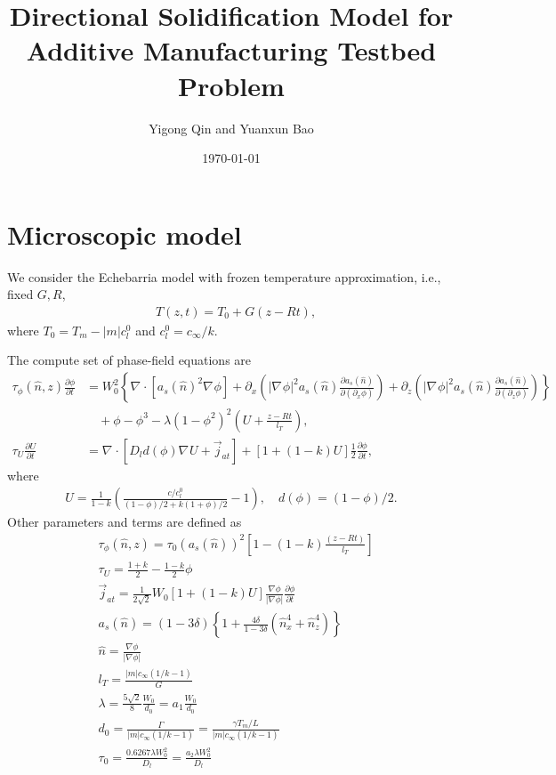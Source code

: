 \documentclass[a4paper,12pt]{article}
\title{Directional Solidification Model for Additive Manufacturing Testbed Problem}
\author{Yigong Qin and Yuanxun Bao}
\date{\today}
\renewcommand{\div}[1]{\nabla_{#1} \cdot}
\newcommand{\grad}[1]{\nabla_{#1}}
\begin{document}
\maketitle




\section{Microscopic model}
We consider the Echebarria model \cite{Tourret2015,Echebarria2010,Plapp2007,Echebarria2004} with frozen temperature approximation, i.e., fixed $G,R$,
\begin{align}
    & T(z,t) = T_0 + G(z-Rt),
\end{align}
where $T_0 = T_m - |m|c_l^0$ and $c_l^0 = c_{\infty}/ k$. 

The compute set of phase-field equations are 
\begin{align}
\tau_{\phi} (\hat{n},z) \frac{\partial \phi}{\partial t} &= W^2_0 \left\{ \div{} [a_s(\hat{n})^2 \grad{} \phi] +  \partial_x \left( |\grad{} \phi|^2 a_s(\hat{n}) \frac{\partial a_s(\hat{n})}{\partial (\partial_x \phi)}  \right)  +
\partial_z \left( |\grad{} \phi|^2 a_s(\hat{n}) \frac{\partial a_s(\hat{n})}{\partial (\partial_z \phi)}  \right)  \right \}  \nonumber \\
& \quad + \phi - \phi^3 - \lambda (1-\phi^2)^2 \left(U + \frac{z-R t}{ l_T} \right),  \label{eq:micro_phi}\\
\tau_U \frac{\partial U}{\partial t} &= \div{} [D_l d(\phi) \grad{} U + \vec{j}_{at}] + [1+(1-k)U]\frac{1}{2}  \frac{\partial \phi}{\partial t}, \label{eq:micro_U}
\end{align}
where 
\begin{align}
U = \frac{1}{1-k} \left( \frac{ c/c_l^0}{(1-\phi)/2 + k(1+\phi)/2} -1\right), \quad d(\phi) = (1-\phi)/2 .
\end{align}
Other parameters and terms are defined as
\begin{align}
    & \tau_{\phi}(\hat{n},z) = \tau_0(a_s(\hat{n}))^2 \left[1-(1-k) \frac{(z-Rt)}{ l_T} \right] \\
	& \tau_U = \frac{1+k}{2} - \frac{1-k}{2}\phi \\
	& \vec{j}_{at} =  \frac{1}{2\sqrt{2}} W_0 [1+(1-k)U] \frac{\nabla \phi}{|\nabla \phi|} \frac{\partial \phi}{\partial t} \\
	& a_{s}(\hat{n}) = (1-3\delta)\left\{1+\frac{4 \delta}{1-3\delta}(\hat{n}_x^4 + \hat{n}_z^4) \right\} \\
    & \hat{n} =  \frac{\nabla \phi}{|\nabla \phi|} \\
    & l_T = \frac{|m|c_{\infty}(1/k-1)}{G} \\
    & \lambda =  \frac{5\sqrt{2}}{8}  \frac{W_0}{d_0} = a_{1} \frac{W_0}{d_0} \\
    & d_0 = \frac{\Gamma}{|m|c_{\infty}(1/k-1)} =   \frac{\gamma T_m/L}{|m|c_{\infty}(1/k-1)}  \\
    & \tau_0 =  \frac{0.6267\lambda W_0^2}{D_l} =  \frac{a_{2}\lambda W_0^2}{D_l}
\end{align}
\end{document}
